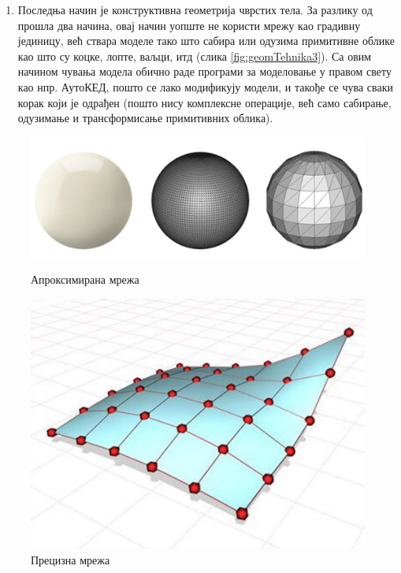 \documentclass[12pt]{article}
\begin{document}
\begin{enumerate}
	\item Последња начин је конструктивна геометрија чврстих тела. За разлику од прошла два начина, овај начин уопште не користи мрежу као градивну јединицу, већ ствара моделе тако што сабира или одузима примитивне облике као што су коцке, лопте, ваљци, итд (слика \ref{fig:geomTehnika3}). Са овим начином чувања модела обично раде програми за моделовање у правом свету као нпр. АутоКЕД, пошто се лако модификују модели, и такође се чува сваки корак који је одрађен (пошто нису комплексне операције, већ само сабирање, одузимање и трансформисање примитивних облика). 
	\end{enumerate}
	
	\begin{figure}[H]
		\begin{minipage}{0.4\linewidth}
			\centering
			\includegraphics[max width=\linewidth]{slike/strukturePodatakaGeometrijaTehnika1.png}
			\caption{Апроксимирана мрежа}
			\label{fig:geomTehnika1}
		\end{minipage}\hfill
		\begin{minipage}{0.4\linewidth}
			\centering
			\includegraphics[max width=\linewidth]{slike/strukturePodatakaGeometrijaTehnika2.png}
			\caption{Прецизна мрежа}
			\label{fig:geomTehnika2}
		\end{minipage}
	\end{figure}
\end{document}
